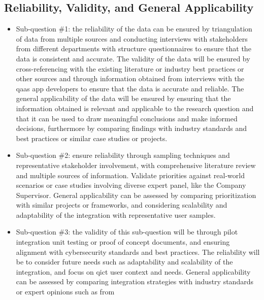 \begin{multicols}{2}
      \subsection{Reliability, Validity, and General Applicability}
      \begin{itemize}[label=-]
            \item Sub-question \#1: the reliability of the data can be ensured by triangulation of data from
                  multiple sources and conducting interviews with stakeholders from different departments with
                  structure questionnaires to ensure that the data is consistent and accurate. The validity of
                  the data will be ensured by  cross-referencing with the existing literature or industry best
                  practices or other sources and  through information obtained from  interviews with the
                  \acrshort{qaas} app developers to ensure  that the data is accurate and reliable. The general
                  applicability of the data will be ensured by  ensuring that the information obtained is relevant
                  and applicable to the research question and  that it can be used to draw meaningful conclusions
                  and make informed decisions, furthermore by comparing findings with industry standards and best
                  practices or similar case studies or projects.
            \item Sub-question \#2: ensure reliability through sampling techniques and representative stakeholder
                  involvement, with comprehensive literature review and multiple sources of information. Validate
                  priorities against real-world scenarios or case studies involving diverse expert panel, like 
                  the Company Supervisor. General applicability can be assessed by comparing prioritization with 
                  similar projects or frameworks, and considering scalability and adaptability of the integration
                  with representative user samples.
            \item Sub-question \#3: the validity of this sub-question will be through pilot integration unit testing
                  or proof of concept documents, and ensuring alignment with cybersecurity standards and best
                  practices. The reliability will be to consider future needs such as adaptability and scalability of
                  the integration, and focus on \acrshort{qict} user context and needs. General applicability can be
                  assessed by comparing integration strategies with industry standards or expert opinions such as from

\end{itemize}
\end{multicols}

